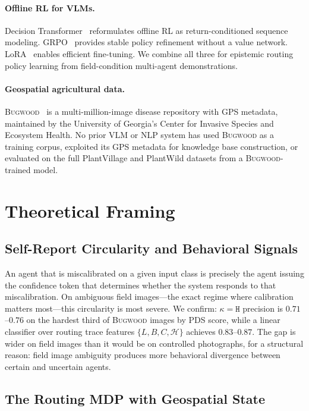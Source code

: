 \documentclass[11pt,twocolumn]{article}
\newcommand{\kH}{\texttt{H}\xspace}
\newcommand{\bugwood}{\textsc{Bugwood}\xspace}
\begin{document}
\paragraph{Offline RL for VLMs.}
Decision Transformer~\citep{chen2021decision}
reformulates offline RL as return-conditioned
sequence modeling. GRPO~\citep{guo2025deepseek}
provides stable policy refinement without a
value network. LoRA~\citep{hu2022lora} enables
efficient fine-tuning. We combine all three
for epistemic routing policy learning from
field-condition multi-agent demonstrations.

\paragraph{Geospatial agricultural data.}
\bugwood~\citep{bugwood} is a multi-million-image
disease repository with GPS metadata, maintained
by the University of Georgia's Center for
Invasive Species and Ecosystem Health. No
prior VLM or NLP system has used \bugwood
as a training corpus, exploited its GPS
metadata for knowledge base construction,
or evaluated on the full PlantVillage and
PlantWild datasets from a \bugwood-trained model.

\section{Theoretical Framing}
\label{sec:theory}

\subsection{Self-Report Circularity and Behavioral Signals}

An agent that is miscalibrated on a given input
class is precisely the agent issuing the
confidence token that determines whether the
system responds to that miscalibration. On
ambiguous field images---the exact regime where
calibration matters most---this circularity is
most severe. We confirm: $\kappa{=}\kH$ precision
is $0.71$--$0.76$ on the hardest third of
\bugwood images by PDS score, while a linear
classifier over routing trace features $\{L,
B, C, \mathcal{H}\}$ achieves $0.83$--$0.87$.
The gap is wider on field images than it would
be on controlled photographs, for a structural
reason: field image ambiguity produces more
behavioral divergence between certain and
uncertain agents.

\subsection{The Routing MDP with Geospatial State}
\end{document}
